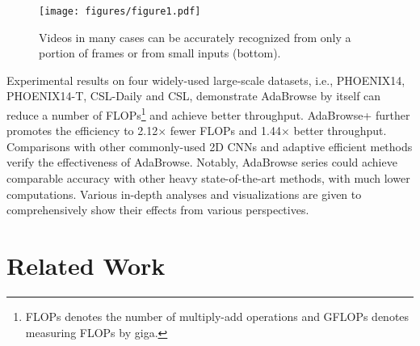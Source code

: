 \documentclass[sigconf]{acmart}
\begin{document}
  \begin{figure}[t]
    \centering
    \texttt{[image: figures/figure1.pdf]} 
    \caption{Videos in many cases can be accurately recognized from only a portion of frames or from small inputs (bottom).}
    \label{fig1}
  \end{figure}
    
Experimental results on four widely-used large-scale datasets, i.e., PHOENIX14, PHOENIX14-T, CSL-Daily and CSL, demonstrate AdaBrowse by itself can reduce a number of FLOPs\footnote{FLOPs denotes the number of multiply-add operations and GFLOPs denotes measuring FLOPs by giga.} and achieve better throughput. AdaBrowse+ further promotes the efficiency to 2.12$\times$ fewer FLOPs and 1.44$\times$ better throughput. Comparisons with other commonly-used 2D CNNs and adaptive efficient methods verify the effectiveness of AdaBrowse. Notably, AdaBrowse series could achieve comparable accuracy with other heavy state-of-the-art methods, with much lower computations. Various in-depth analyses and visualizations are given to comprehensively show their effects from various perspectives.
  
\section{Related Work}
\end{document}
